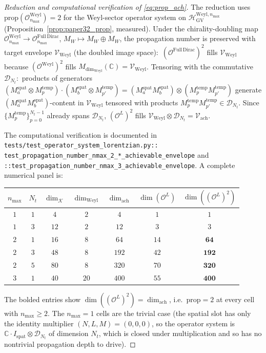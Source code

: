 \documentclass[11pt,a4paper]{article}
\theoremstyle{plain}
\theoremstyle{definition}
\newcommand{\nmax}{n_{\max}}
\newcommand{\Nt}{N_t}
\newcommand{\Krein}{\mathcal{K}}
\newcommand{\Op}{\mathcal{O}}
\newcommand{\C}{\mathbb{C}}
\newcommand{\Mat}{M}
\newcommand{\HGV}{\mathcal{H}_{\mathrm{GV}}}
\newcommand{\prop}{\mathrm{prop}}
\newcommand{\spat}{\mathrm{spat}}
\newcommand{\temp}{\mathrm{temp}}
\newcommand{\Weyl}{\mathrm{Weyl}}
\newcommand{\achievable}{\mathrm{ach}}
\begin{document}
\begin{proof}[Reduction and computational verification of \eqref{eq:prop_ach}]
The reduction uses $\prop(\Op_{\nmax}^\Weyl) = 2$ for the Weyl-sector
operator system on $\HGV^{\Weyl, \nmax}$
(Proposition~\ref{prop:paper32_prop}, measured). Under
the chirality-doubling map $\Op_{\nmax}^\Weyl \to
\Op_{\nmax}^{\mathrm{Full\,Dirac}}$, $M_W \mapsto M_W \oplus M_W$,
the propagation number is preserved with target envelope
$\mathcal{V}_\Weyl$ (the doubled image space):\
$(\Op^{\mathrm{Full\,Dirac}})^2$ fills $\mathcal{V}_\Weyl$ because
$(\Op^\Weyl)^2$ fills $\Mat_{\dim_\Weyl}(\C) =
\mathcal{V}_\Weyl$. Tensoring with the commutative
$\mathcal{D}_{\Nt}$:\ products of generators
$(M^\spat_a \otimes M_p^\temp) \cdot (M^\spat_b \otimes M_{p'}^\temp)
= (M^\spat_a M^\spat_b) \otimes (M_p^\temp M_{p'}^\temp)$ generate
$(M^\spat_a M^\spat_b)$-content in $\mathcal{V}_\Weyl$ tensored with
products $M_p^\temp M_{p'}^\temp \in \mathcal{D}_{\Nt}$. Since
$\{M_p^\temp\}_{p = 0}^{\Nt - 1}$ already spans $\mathcal{D}_{\Nt}$,
$(\Op^L)^2$ fills $\mathcal{V}_\Weyl \otimes \mathcal{D}_{\Nt} =
\mathcal{V}_\achievable$.

The computational verification is documented in
\texttt{tests/test\_operator\_system\_lorentzian.py::%
test\_propagation\_number\_nmax\_2\_*\_achievable\_envelope} and
\texttt{::test\_propagation\_number\_nmax\_3\_achievable\_envelope}.
A complete numerical panel is:

\medskip
\begin{center}\renewcommand{\arraystretch}{1.20}
\begin{tabular}{c|c|c|c|c|c|c}
$\nmax$ & $\Nt$ & $\dim_\Krein$ & $\dim_\Weyl$
   & $\dim_\achievable$
   & $\dim(\Op^L)$ & $\dim((\Op^L)^2)$ \\
\hline
$1$ & $1$ & $4$  & $2$ & $4$  & $1$  & $1$  \\
$1$ & $3$ & $12$ & $2$ & $12$ & $3$  & $3$  \\
$2$ & $1$ & $16$ & $8$ & $64$ & $14$ & $\mathbf{64}$ \\
$2$ & $3$ & $48$ & $8$ & $192$ & $42$ & $\mathbf{192}$ \\
$2$ & $5$ & $80$ & $8$ & $320$ & $70$ & $\mathbf{320}$ \\
$3$ & $1$ & $40$ & $20$ & $400$ & $55$ & $\mathbf{400}$ \\
\end{tabular}
\end{center}
\medskip

The bolded entries show $\dim((\Op^L)^2) = \dim_\achievable$, i.e.\
$\prop = 2$ at every cell with $\nmax \ge 2$. The $\nmax = 1$ cells
are the trivial case (the spatial slot has only the identity
multiplier $(N, L, M) = (0, 0, 0)$, so the operator system is
$\C \cdot I_\spat \otimes \mathcal{D}_{\Nt}$ of dimension $\Nt$,
which is closed under multiplication and so has no nontrivial
propagation depth to drive).
\end{proof}
\end{document}
